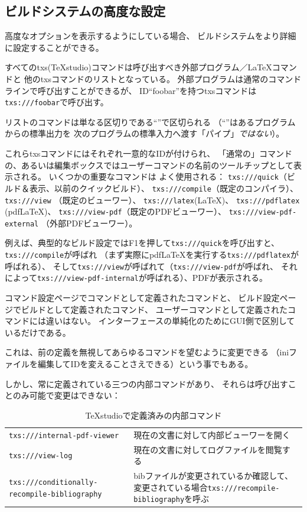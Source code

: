 \subsection{ビルドシステムの高度な設定}

高度なオプションを表示するようにしている場合、
ビルドシステムをより詳細に設定することができる。

すべてのtxs(TeXstudio)コマンドは呼び出すべき外部プログラム／LaTeXコマンドと
他のtxsコマンドのリストとなっている。
外部プログラムは通常のコマンドラインで呼び出すことができるが、
ID``foobar''を持つtxsコマンドは\texttt{txs:///foobar}で呼び出す。

リストのコマンドは単なる区切りである``\textbar{}''で区切られる
（``\textbar{}''はあるプログラムからの標準出力を
次のプログラムの標準入力へ渡す「パイプ」\emph{ではない}）。

これらtxsコマンドにはそれぞれ一意的なIDが付けられ、
「通常の」コマンドの、あるいは編集ボックスではユーザーコマンドの名前のツールチップとして表示される。
いくつかの重要なコマンドは
よく使用される： \texttt{txs:///quick}（ビルド＆表示、以前のクイックビルド）、
 \texttt{txs:///compile}（既定のコンパイラ）、
 \texttt{txs:///view} （既定のビューワー）、 \texttt{txs:///latex}(LaTeX)、
 \texttt{txs:///pdflatex} (pdfLaTeX)、 \texttt{txs:///view-pdf}（既定のPDFビューワー）、
 \texttt{txs:///view-pdf-external} （外部PDFビューワー）。

例えば、典型的なビルド設定ではF1を押して\texttt{txs:///quick}を呼び出すと、
\texttt{txs:///compile}が呼ばれ
（まず実際にpdfLaTeXを実行する\texttt{txs:///pdflatex}が呼ばれる）、
そして\texttt{txs:///view}が呼ばれて（\texttt{txs:///view-pdf}が呼ばれ、
それによって\texttt{txs:///view-pdf-internal}が呼ばれる）、PDFが表示される。

コマンド設定ページでコマンドとして定義されたコマンドと、
ビルド設定ページでビルドとして定義されたコマンド、
ユーザーコマンドとして定義されたコマンドには違いはない。
インターフェースの単純化のためにGUI側で区別しているだけである。

これは、前の定義を無視してあらゆるコマンドを望むように変更できる
（iniファイルを編集してIDを変えることさえできる）という事でもある。

しかし、常に定義されている三つの内部コマンドがあり、
それらは呼び出すことのみ可能で変更はできない：

\begin{table}[H]
  \centering
  \caption{TeXstudioで定義済みの内部コマンド}
  \begin{tabularx}{\linewidth}{lX}
    \hline
    \texttt{txs:///internal-pdf-viewer} & 現在の文書に対して内部ビューワーを開く\\
    \texttt{txs:///view-log} & 現在の文書に対してログファイルを閲覧する\\
    \texttt{txs:///conditionally-recompile-bibliography}
      & bibファイルが変更されているか確認して、
      変更されている場合\texttt{txs:///recompile-bibliography}を呼ぶ\\
    \hline
  \end{tabularx}
\end{table}


